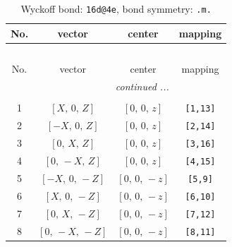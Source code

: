 \documentclass[fleqn,8pt]{jsarticle}
\begin{document}
\begin{longtable}{cccc}
\caption{Wyckoff bond: {\tt 16d@4e}, bond symmetry: {\tt .m.}}
 \\
 \hline \hline
No. & vector & center & mapping \\ \hline \endfirsthead

\multicolumn{3}{l}{\tablename\ \thetable{}} \\
 \hline \hline
No. & vector & center & mapping \\ \hline \endhead

 \hline \hline
\multicolumn{3}{r}{\footnotesize\it continued ...} \\ \endfoot

 \hline \hline
\multicolumn{3}{r}{} \\ \endlastfoot

1 & $\left[ X,\, 0,\, Z \right]$ & $\left[ 0,\, 0,\, z \right]$ & {\tt [1,13]} \\ \hline
2 & $\left[ - X,\, 0,\, Z \right]$ & $\left[ 0,\, 0,\, z \right]$ & {\tt [2,14]} \\ \hline
3 & $\left[ 0,\, X,\, Z \right]$ & $\left[ 0,\, 0,\, z \right]$ & {\tt [3,16]} \\ \hline
4 & $\left[ 0,\, - X,\, Z \right]$ & $\left[ 0,\, 0,\, z \right]$ & {\tt [4,15]} \\ \hline
5 & $\left[ - X,\, 0,\, - Z \right]$ & $\left[ 0,\, 0,\, - z \right]$ & {\tt [5,9]} \\ \hline
6 & $\left[ X,\, 0,\, - Z \right]$ & $\left[ 0,\, 0,\, - z \right]$ & {\tt [6,10]} \\ \hline
7 & $\left[ 0,\, X,\, - Z \right]$ & $\left[ 0,\, 0,\, - z \right]$ & {\tt [7,12]} \\ \hline
8 & $\left[ 0,\, - X,\, - Z \right]$ & $\left[ 0,\, 0,\, - z \right]$ & {\tt [8,11]} \\
\end{longtable}
\renewcommand{\arraystretch}{1.2}
\end{document}
